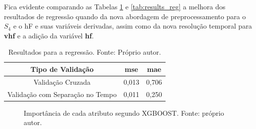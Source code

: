 Fica evidente comparando as Tabelas \ref{tab:results_v1_reg} e \ref{tab:results_reg} a melhora dos resultados de regressão quando da nova abordagem de preprocessamento para o $S_4$ e o hF e suas variáveis derivadas, assim como da nova resolução temporal para {\bf vhf} e a adição da variável {\bf hf}.

\begin{table}[H]
\begin{center}
\begin{tabular}{|c|c|c|}
\hline
Tipo de Validação & mse       & mae   \\ \hline
Validação Cruzada                   & 0,013   & 0,706  \\ \hline
Validação com Separação no Tempo    & 0,011   & 0,250  \\ \hline
\end{tabular}
\end{center}
\vspace{12pt}
\caption{Resultados para a regressão. Fonte: Próprio autor.}
\label{tab:results_v1_reg}
\end{table}

\begin{figure}[H]
\center
{}
\caption{Importância de cada atributo segundo XGBOOST. Fonte: próprio autor.}\label{fig:regv1}
\end{figure}

